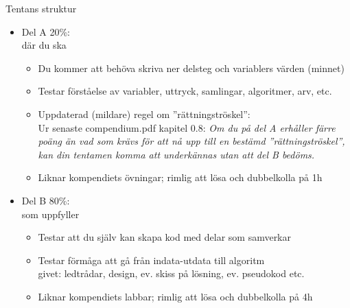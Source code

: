 \begin{Slide}{Tentans struktur}
\begin{itemize}
\item Del A 20\%:\\ där du ska 
\begin{itemize}\SlideFontTiny
\item Du kommer att behöva skriva ner delsteg och variablers värden (minnet)
\item Testar förståelse av variabler, uttryck, samlingar, algoritmer, arv, etc.
\item Uppdaterad (mildare) regel om ''rättningströskel'': \\
Ur senaste compendium.pdf kapitel 0.8: \textit{Om du på del A erhåller färre poäng än vad som krävs för att nå upp till en bestämd ''rättningströskel'', kan din tentamen komma att underkännas utan att del B bedöms.}
\item Liknar kompendiets övningar; rimlig att lösa och dubbelkolla på 1h
\end{itemize}


\item Del B 80\%:\\ som uppfyller 
\begin{itemize}\SlideFontTiny
\item Testar att du själv kan skapa kod med delar som samverkar
\item Testar förmåga att gå från indata-utdata till algoritm \\
 givet: ledtrådar, design, ev. skiss på lösning, ev. pseudokod etc.
\item Liknar kompendiets labbar; rimlig att lösa och dubbelkolla på 4h 
\end{itemize}

\end{itemize}
\end{Slide}



